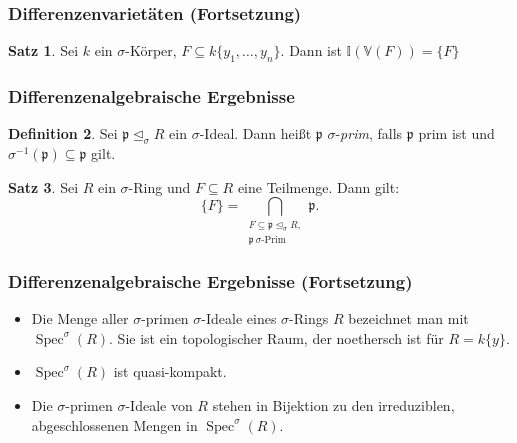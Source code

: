 \documentclass{beamer}
\def\I{\mathbb{I}}
\def\VV{\mathbb{V}}
\def\p{\mathfrak{p}}
\def\s{\sigma}
\def\si{\unlhd_{\sigma}}
\def\Spec{\operatorname{Spec}}
\theoremstyle{definition}
\newtheorem{satz}{Satz}[section]
\newtheorem{defn}[satz]{Definition}
\begin{document}
\begin{frame}\frametitle{Differenzenvarietäten (Fortsetzung)}
\begin{satz}
Sei $k$ ein $\s$-Körper, $F \subseteq k\{y_1,\ldots,y_n\}$.
Dann ist $\I(\VV(F)) = \{F\}$
\end{satz}
\end{frame}

\begin{frame}\frametitle{Differenzenalgebraische Ergebnisse}
\begin{defn}
Sei $\p \si R$ ein $\s$-Ideal. Dann heißt $\p$ $\s$-\emph{prim}, falls $\p$ prim ist und $\s^{-1}(\p) \subseteq \p$ gilt.
\end{defn}


\begin{satz}
Sei $R$ ein $\s$-Ring und $F \subseteq R$ eine Teilmenge. Dann gilt:
\begin{equation*} \{F\} = \bigcap_{\substack{F \subseteq \p \si R, \\ \p ~ \s\text{-Prim}}} \p. \end{equation*}
\end{satz}
\end{frame}

\begin{frame}\frametitle{Differenzenalgebraische Ergebnisse (Fortsetzung)}
\begin{itemize}
\item Die Menge aller $\s$-primen $\s$-Ideale eines $\s$-Rings $R$ bezeichnet man mit $\Spec^\s(R)$. 
Sie ist ein topologischer Raum, der noethersch ist für $R = k\{y\}$.
\item $\Spec^\s(R)$ ist quasi-kompakt.
\item Die $\s$-primen $\s$-Ideale von $R$ stehen in Bijektion zu den irreduziblen, abgeschlossenen Mengen in $\Spec^\s(R)$.
\end{itemize}
\end{frame}

\end{document}
